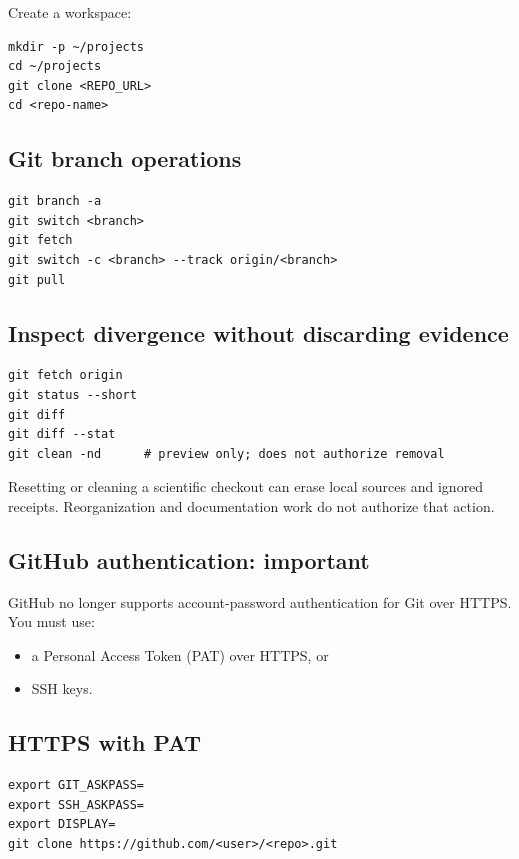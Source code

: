 \documentclass[11pt,a4paper]{article}
\begin{document}
Create a workspace:

\begin{lstlisting}[style=shell]
mkdir -p ~/projects
cd ~/projects
git clone <REPO_URL>
cd <repo-name>
\end{lstlisting}

\subsection{Git branch operations}

\begin{lstlisting}[style=shell]
git branch -a
git switch <branch>
git fetch
git switch -c <branch> --track origin/<branch>
git pull
\end{lstlisting}

\subsection{Inspect divergence without discarding evidence}

\begin{lstlisting}[style=shell]
git fetch origin
git status --short
git diff
git diff --stat
git clean -nd      # preview only; does not authorize removal
\end{lstlisting}

Resetting or cleaning a scientific checkout can erase local sources and ignored
receipts. Reorganization and documentation work do not authorize that action.

\subsection{GitHub authentication: important}

GitHub no longer supports account-password authentication for Git over HTTPS. You must use:

\begin{itemize}[leftmargin=1.5em]
  \item a Personal Access Token (PAT) over HTTPS, or
  \item SSH keys.
\end{itemize}

\subsection{HTTPS with PAT}

\begin{lstlisting}[style=shell]
export GIT_ASKPASS=
export SSH_ASKPASS=
export DISPLAY=
git clone https://github.com/<user>/<repo>.git
\end{lstlisting}
\end{document}
